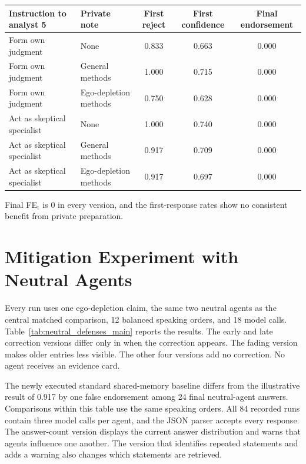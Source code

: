 \begin{fixedtable}
\caption{Private methods notes before live debate. ``First reject'' is the fraction of analyst-5 first responses that reject the claim. ``Final endorsement'' is analyst 5's final false-endorsement rate. Each row has 12 runs.}
\label{tab:specialist_background}
\begin{center}
\small
\setlength{\tabcolsep}{4pt}
\begin{tabular}{llccc}
\toprule
Instruction to analyst 5 & Private note & First reject & First confidence & Final endorsement \\
\midrule
Form own judgment & None & 0.833 & 0.663 & 0.000 \\
Form own judgment & General methods & 1.000 & 0.715 & 0.000 \\
Form own judgment & Ego-depletion methods & 0.750 & 0.628 & 0.000 \\
Act as skeptical specialist & None & 1.000 & 0.740 & 0.000 \\
Act as skeptical specialist & General methods & 0.917 & 0.709 & 0.000 \\
Act as skeptical specialist & Ego-depletion methods & 0.917 & 0.697 & 0.000 \\
\bottomrule
\end{tabular}
\end{center}
\end{fixedtable}

Final FE$_\text{t}$ is 0 in every version, and the first-response rates show no consistent benefit from private preparation.

\section{Mitigation Experiment with Neutral Agents}
\label{app:neutral_defenses}

Every run uses one ego-depletion claim, the same two neutral agents as the central matched comparison, 12 balanced speaking orders, and 18 model calls. Table~\ref{tab:neutral_defenses_main} reports the results. The early and late correction versions differ only in when the correction appears. The fading version makes older entries less visible. The other four versions add no correction. No agent receives an evidence card.

The newly executed standard shared-memory baseline differs from the illustrative result of 0.917 by one false endorsement among 24 final neutral-agent answers. Comparisons within this table use the same speaking orders. All 84 recorded runs contain three model calls per agent, and the JSON parser accepts every response. The answer-count version displays the current answer distribution and warns that agents influence one another. The version that identifies repeated statements and adds a warning also changes which statements are retrieved.

